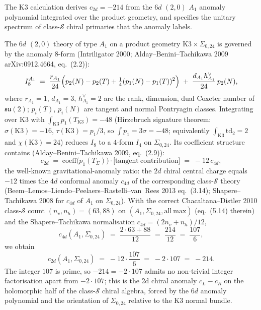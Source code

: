 The K3 calculation derives $c_{2d} = -214$ from the $6d$ $(2,0)$ $A_1$ anomaly
polynomial integrated over the product geometry, and specifies the
unitary spectrum of class-$\mathcal S$ chiral primaries that the
anomaly labels.

\begin{remark}[$6d$ anomaly-polynomial derivation of $c_{2d}=-214$]
\label{rem:anomtop-anomaly-polynomial}
The $6d$ $(2,0)$ theory of type $A_1$ on a product geometry
$\mathrm K3 \times \Sigma_{0,24}$ is governed by the anomaly
$8$-form (Intriligator 2000; Alday--Benini--Tachikawa 2009
arXiv:0912.4664, eq.~(2.2)):
\[
 I_8^{A_1}
 \;=\;
 \frac{r_{A_1}}{24}\Bigl(p_2(N) - p_2(T) + \tfrac{1}{4}(p_1(N)-p_1(T))^2\Bigr)
 \;+\;
 \frac{d_{A_1} h^\vee_{A_1}}{24}\,p_2(N),
\]
where $r_{A_1}=1$, $d_{A_1}=3$, $h^\vee_{A_1}=2$ are the rank,
dimension, dual Coxeter number of $\mathfrak{su}(2)$;
$p_i(T)$, $p_i(N)$ are tangent and normal Pontryagin classes.
Integrating over $\mathrm K3$ with
$\int_{\mathrm K3} p_1(T_{\mathrm K3}) = -48$ (Hirzebruch signature
theorem: $\sigma(\mathrm K3) = -16$, $\tau(\mathrm K3) = p_1/3$,
so $\int p_1 = 3\sigma = -48$; equivalently
$\int_{\mathrm K3}\mathrm{td}_2 = 2$ and $\chi(\mathrm K3)=24$)
reduces $I_8$ to a $4$-form $I_4$ on $\Sigma_{0,24}$. Its
coefficient structure contains (Alday--Benini--Tachikawa 2009,
eq.~(2.9)):
\[
 c_{2d} \;=\; \mathrm{coeff}\bigl(p_1(T_\Sigma)\bigr)\cdot
 \bigl[\mathrm{tangent\ contribution}\bigr]
 \;=\; -12\, c_{4d},
\]
the well-known gravitational-anomaly ratio: the $2d$ chiral central
charge equals $-12$ times the $4d$ conformal anomaly $c_{4d}$ of
the corresponding class-$\mathcal S$ theory
(Beem--Lemos--Liendo--Peelaers--Rastelli--van~Rees 2013 eq.~(3.14);
Shapere--Tachikawa 2008 for $c_{4d}$ of $A_1$ on $\Sigma_{0,24}$).
With the correct Chacaltana--Distler 2010 class-$\mathcal S$ count
$(n_v, n_h) = (63, 88)$ on $(A_1, \Sigma_{0,24}, \mathrm{all\ max})$
(eq.~(5.14) therein) and the Shapere--Tachikawa normalisation
$c_{4d} = (2n_v + n_h)/12$,
\[
 c_{4d}(A_1, \Sigma_{0,24})
 \;=\; \frac{2\cdot 63 + 88}{12}
 \;=\; \frac{214}{12}
 \;=\; \frac{107}{6},
\]
we obtain
\[
 c_{2d}(A_1, \Sigma_{0,24})
 \;=\; -12 \cdot \frac{107}{6}
 \;=\; -2 \cdot 107
 \;=\; -214.
\]
The integer $107$ is prime, so $-214 = -2\cdot 107$ admits no
non-trivial integer factorisation apart from $-2\cdot 107$; this is
the 2d chiral anomaly $c_L - c_R$ on the holomorphic half of the
class-$\mathcal S$ chiral algebra, forced by the $6d$ anomaly
polynomial and the orientation of $\Sigma_{0,24}$ relative to the
K3 normal bundle.
\end{remark}

